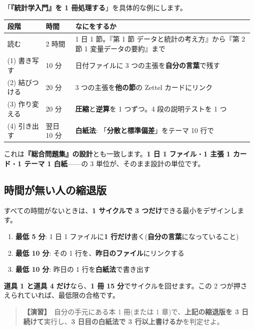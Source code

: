 \documentclass{article}
\begin{document}
「\textbf{『統計学入門』を 1 冊処理する}」を具体的な例にします。

\begin{center}
\begin{tabular}{|l|l|l|}
\hline
段階 & 時間 & なにをするか \\
\hline
読む & 2 時間 & 1 日 1 節。『第 1 節 データと統計の考え方』から『第 2 節 1 変量データの要約』まで \\
\hline
(1) 書き写す & 10 分 & 日付ファイルに 3 つの主張を\textbf{自分の言葉}で残す \\
\hline
(2) 結びつける & 20 分 & 3 つの主張を\textbf{他の節}の Zettel カードにリンク \\
\hline
(3) 作り変える & 20 分 & \textbf{圧縮}と\textbf{逆算}を 1 つずつ。4 段の説明テストを 1 つ \\
\hline
(4) 引き出す & 翌日 10 分 & \textbf{白紙法}: 「\textbf{分散と標準偏差}」をテーマ 10 行で \\
\hline
\end{tabular}
\end{center}

これは\textbf{『総合問題集』の設計}とも一致します。\textbf{1 日 1 ファイル}・\textbf{1 主張 1 カード}・\textbf{1 テーマ 1 白紙}——の 3 単位が、そのまま設計の単位です。

\subsection{時間が無い人の縮退版}

すべての時間がないときは、\textbf{1 サイクルで 3 つだけ}できる最小をデザインします。

\begin{enumerate}
\item \textbf{最低 5 分}: 1 日 1 ファイルに\textbf{1 行だけ}書く(\textbf{自分の言葉}になっていること)
\item \textbf{最低 10 分}: その 1 行を、\textbf{昨日のファイル}にリンクする
\item \textbf{最低 10 分}: 昨日の 1 行を\textbf{白紙法}で書き出す
\end{enumerate}

\textbf{道具 1 と道具 4 だけ}なら、\textbf{1 冊 15 分}でサイクルを回せます。この 2 つが押さえられていれば、最低限の合格です。

\begin{quote}
\textbf{【演習】}\ 自分の手元にある本 1 冊(または 1 章)で、\textbf{上記の縮退版を 3 日続けて}実行し、\textbf{3 日目の白紙法で 3 行以上書けるか}を判定せよ。
\end{quote}
\end{document}
